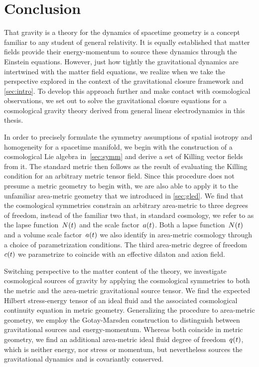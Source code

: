 \chapter{Conclusion}

That gravity is a theory for the dynamics of spacetime geometry is a concept familiar to any student of general relativity. It is equally established that matter fields provide their energy-momentum to source these dynamics through the Einstein equations. However, just how tightly the gravitational dynamics are intertwined with the matter field equations, we realize when we take the perspective explored in the context of the gravitational closure framework and \autoref{sec:intro}. To develop this approach further and make contact with cosmological observations, we set out to solve the gravitational closure equations for a cosmological gravity theory derived from general linear electrodynamics in this thesis.

In order to precisely formulate the symmetry assumptions of spatial isotropy and homogeneity for a spacetime manifold, we begin with the construction of a cosmological Lie algebra in~\autoref{sec:symm} and derive a set of Killing vector fields from it. The standard \FLRW{} metric then follows as the result of evaluating the Killing condition for an arbitrary metric tensor field. Since this procedure does not presume a metric geometry to begin with, we are also able to apply it to the unfamiliar area-metric geometry that we introduced in \autoref{sec:gled}. We find that the cosmological symmetries constrain an arbitrary area-metric to three degrees of freedom, instead of the familiar two that, in standard \FLRW{} cosmology, we refer to as the lapse function~$N(t)$ and the scale factor~$a(t)$. Both a lapse function~$N(t)$ and a volume scale factor~$a(t)$ we also identify in area-metric cosmology through a choice of parametrization conditions. The third area-metric degree of freedom~$c(t)$ we parametrize to coincide with an effective dilaton and axion field.

Switching perspective to the matter content of the theory, we investigate cosmological sources of gravity by applying the cosmological symmetries to both the metric and the area-metric gravitational source tensor. We find the expected Hilbert stress-energy tensor of an ideal fluid and the associated cosmological continuity equation in metric geometry. Generalizing the procedure to area-metric geometry, we employ the Gotay-Marsden construction to distinguish between gravitational sources and energy-momentum. Whereas both coincide in metric geometry, we find an additional area-metric ideal fluid degree of freedom~$q(t)$, which is neither energy, nor stress or momentum, but nevertheless sources the gravitational dynamics and is covariantly conserved.

